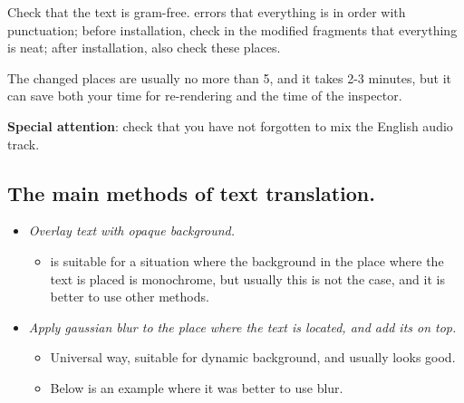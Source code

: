 \documentclass[
a4paper, %
12pt, %
article,
onecolumn, %
openany, %
]{memoir}
\begin{document}
Check that the text is gram-free. errors
that everything is in order with punctuation;
before installation, check in the modified fragments
that everything is neat;
after installation, also check these places.

The changed places are usually no more than 5, and it takes 2-3 minutes,
but it can save both your time for re-rendering
and the time of the inspector.

\textbf{Special attention}: check that you have not forgotten to mix the
English audio track.

\subsection{The main methods of text translation.}

\begin{itemize}
\item\emph{Overlay text with opaque background.}

\begin{itemize}
\item is suitable for a situation where the background in the place where the text
is placed is monochrome, but usually this is not the case, and it is better to use other methods.
\end{itemize}

\item \emph{Apply gaussian blur to the place where the text is located, and add
its on top.}

\begin{itemize}
\item Universal way, suitable for
dynamic background, and usually looks good.

\item Below is an example where it was better to use blur.


\end{itemize}
\end{itemize}
\end{document}
